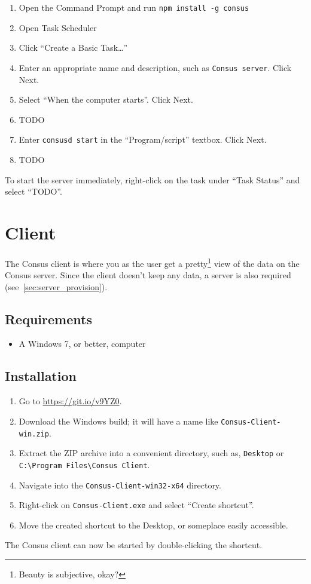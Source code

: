 \begin{enumerate}
  \item Open the Command Prompt and run \texttt{npm install -g consus}
  \item Open Task Scheduler
  \item Click ``Create a Basic Task\ldots''
  \item Enter an appropriate name and description, such as \texttt{Consus server}. Click Next.
  \item Select ``When the computer starts''. Click Next.
  \item TODO
  \item Enter \texttt{consusd start} in the ``Program/script'' textbox. Click Next.
  \item TODO
\end{enumerate}

To start the server immediately, right-click on the task under ``Task Status'' and select ``TODO''.

\section{Client}
\label{sec:client_provision}

The Consus client is where you as the user get a pretty\footnote{Beauty is subjective, okay?} view of the data on the Consus server.
Since the client doesn't keep any data, a server is also required (see~\autoref{sec:server_provision}).

\subsection{Requirements}
\label{subsec:client_reqa}

\begin{itemize}
  \item A Windows 7, or better, computer
\end{itemize}

\subsection{Installation}
\label{subsec:client_install}

\begin{enumerate}
  \item Go to \url{https://git.io/v9YZ0}.
  \item Download the Windows build; it will have a name like \texttt{Consus-Client-win.zip}.
  \item Extract the ZIP archive into a convenient directory, such as, \texttt{Desktop} or \texttt{C:\textbackslash{}Program Files\textbackslash{}Consus Client}.
  \item Navigate into the \texttt{Consus-Client-win32-x64} directory.
  \item Right-click on \texttt{Consus-Client.exe} and select ``Create shortcut''.
  \item Move the created shortcut to the Desktop, or someplace easily accessible.
\end{enumerate}

The Consus client can now be started by double-clicking the shortcut.

